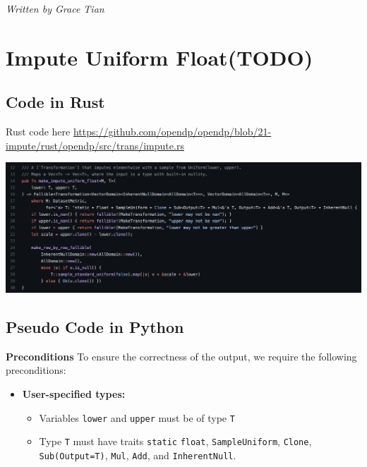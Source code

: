 \documentclass[11pt,a4paper]{article}
\begin{document}
\vspace{0.2cm}
\emph{Written by Grace Tian}
\vspace{0.2cm}


\section{Impute Uniform Float(TODO)}
 
\subsection{Code in Rust}

Rust code here \url{https://github.com/opendp/opendp/blob/21-impute/rust/opendp/src/trans/impute.rs}

\includegraphics[width=\textwidth]{make_impute_unif_float.png}


\subsection{Pseudo Code in Python}

\textbf{Preconditions}
To ensure the correctness of the output, we require the following preconditions:

\begin{itemize}
    \item \textbf{User-specified types:}
    \begin{itemize}
        \item Variables \texttt{lower} and \texttt{upper} must be of type \texttt{T}
        \item Type \texttt{T} must have traits \texttt{static} \texttt{float}, \texttt{SampleUniform}, \texttt{Clone}, \texttt{Sub(Output=T)}, \texttt{Mul}, \texttt{Add}, and \texttt{InherentNull}.
    \end{itemize}
\end{itemize}
\end{document}
